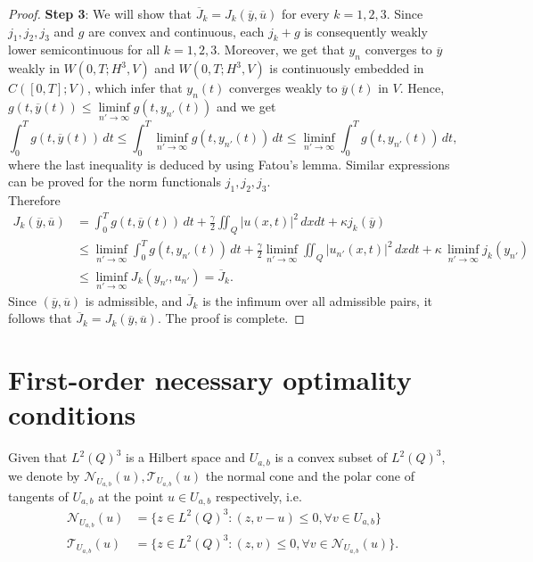 \documentclass[reqno]{amsart}
\begin{document}
\begin{proof}
		\textbf{Step 3}: We will show that $\overline{J}_k=J_k(\overline{y},\overline{u})$ for every $k=1,2,3$. 
		Since $j_1,j_2,j_3$ and $g$ are convex and continuous, each $j_k+g$ is consequently weakly lower semicontinuous for all $k=1,2,3$. Moreover, we get that $y_n$ converges to $\overline{y}$ weakly in $W(0,T;H^3,V)$ and $W(0,T;H^3,V)$ is continuously embedded in $C([0,T];V)$, which infer that $y_n(t)$ converges weakly to $\overline{y} (t)$ in $V$. Hence, $g(t,\overline{y}(t))\leq \underset{n'\rightarrow\infty}{\liminf} g(t, y_{n'}(t))$ and we get
		\begin{equation*}
			\int_{0}^{T} g(t,\overline{y}(t))\,dt \leq\displaystyle\int_{0}^{T} {\liminf_{n'\to \infty}} g(t,y_{n'}(t))\,dt \leq {\liminf_{n'\to\infty}} \int_0^Tg(t,y_{n'}(t))\,dt,
		\end{equation*}
		where the last inequality is deduced by using Fatou's lemma.
		Similar expressions can be proved for the norm functionals $j_1,j_2,j_3$. \\
		Therefore
		\begin{align*}
			J_k(\overline{y},\overline{u}) &= \displaystyle\int_{0}^{T} g(t,\overline{y}(t))\,dt +\frac{\gamma}{2}\iint_Q \vert u(x,t) \vert^2 \, dxdt + \kappa j_k (\overline{y}) \\ &\leq {\liminf_{n' \to \infty}} \displaystyle\int_{0}^{T} g(t,y_{n'}(t))\,dt+\frac{\gamma}{2}{\liminf_{n'\to \infty}} \displaystyle\iint_Q  \vert u_{n'}(x,t) \vert^2 \, dxdt + \kappa \,{\liminf_{n'\to \infty}} j_k(y_{n'}) \\ &\leq {\liminf_{n' \to \infty}} J_k(y_{n'},u_{n'})=\overline{J}_k.
		\end{align*}
		Since $(\overline{y},\overline{u}) $ is admissible, and $\overline{J}_k $ is the infimum over all admissible pairs, it follows that $\overline 
		{J}_k=J_k(\overline{y},\overline{u})$. The proof is complete.
	\end{proof}
	\section{First-order necessary optimality conditions}
	Given that $L^2(Q)^3$ is a Hilbert space and $U_{a,b}$ is a convex subset of $L^2(Q)^3$, we denote by $\mathcal{N}_{U_{a,b}}(u), \mathcal{T}_{U_{a,b}}(u)$
	the normal cone and the polar cone of tangents of $U_{a,b}$ at the point $u \in U_{a,b}$ respectively, i.e.
	\begin{align*}
		\mathcal{N}_{U_{a,b}}(u)&=\{z \in L^2(Q)^3: (z,v-u) \leq 0, \forall v \in U_{a,b}\}\\
		\mathcal{T}_{U_{a,b}}(u)&=\{z\in L^2(Q)^3: (z,v) \leq 0, \forall v\in \mathcal{N}_{U_{a,b}}(u)\}.
	\end{align*}
	
\end{document}
